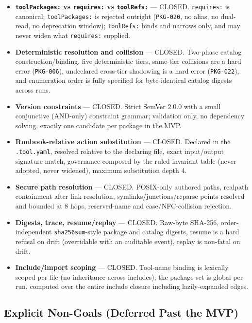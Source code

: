 \begin{itemize}
  \item \textbf{\texttt{toolPackages:} vs \texttt{requires:} vs \texttt{toolRefs:}} --- CLOSED.
        \texttt{requires:} is canonical; \texttt{toolPackages:} is rejected outright
        (\texttt{PKG-020}, no alias, no dual-read, no deprecation window); \texttt{toolRefs:} binds
        and narrows only, and may never widen what \texttt{requires:} supplied.
  \item \textbf{Deterministic resolution and collision} --- CLOSED. Two-phase catalog
        construction/binding, five deterministic tiers, same-tier collisions are a hard error
        (\texttt{PKG-006}), undeclared cross-tier shadowing is a hard error (\texttt{PKG-022}), and
        enumeration order is fully specified for byte-identical catalog digests across runs.
  \item \textbf{Version constraints} --- CLOSED. Strict SemVer 2.0.0 with a small conjunctive
        (AND-only) constraint grammar; validation only, no dependency solving, exactly one candidate
        per package in the MVP.
  \item \textbf{Runbook-relative action substitution} --- CLOSED. Declared in the \texttt{.tool.yaml},
        resolved relative to the declaring file, exact input/output signature match, governance
        composed by the ruled invariant table (never adopted, never widened), maximum substitution
        depth 4.
  \item \textbf{Secure path resolution} --- CLOSED. POSIX-only authored paths, realpath containment
        after link resolution, symlinks/junctions/reparse points resolved and bounded at 8 hops,
        reserved-name and case/NFC-collision rejection.
  \item \textbf{Digests, trace, resume/replay} --- CLOSED. Raw-byte SHA-256, order-independent
        \texttt{sha256sum}-style package and catalog digests, resume is a hard refusal on drift
        (overridable with an auditable event), replay is non-fatal on drift.
  \item \textbf{Include/import scoping} --- CLOSED. Tool-name binding is lexically scoped per file
        (no inheritance across includes); the package set is global per run, computed over the
        entire include closure including lazily-expanded edges.
\end{itemize}

\subsection{Explicit Non-Goals (Deferred Past the MVP)}
\label{sec:tool-packages-open-nongoals}

